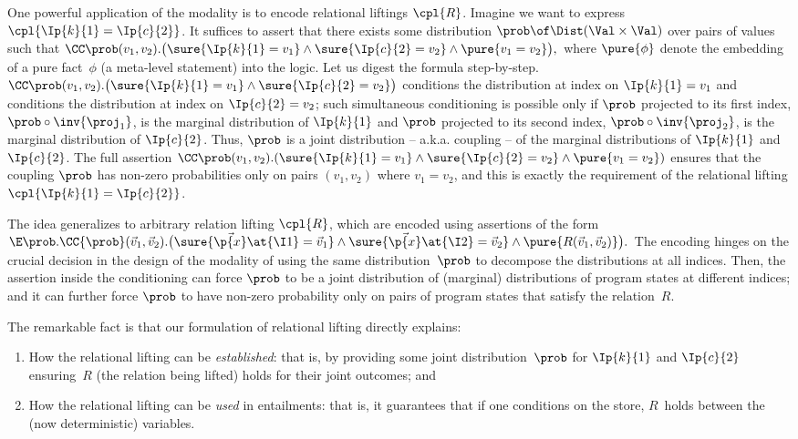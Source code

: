 \documentclass[acmsmall,nonacm,screen,appendix]{acmart}
\begin{document}
One powerful application of the \supercond modality is to encode relational
liftings $\cpl{R}$.
Imagine we want to express $\cpl{ \Ip{k}{1} = \Ip{c}{2} }$.
It suffices to assert that there exists some distribution
$\prob \of \Dist(\Val\times\Val)$ over pairs of values such that
$
  \CC\prob (v_1,v_2).\bigl(
    \sure{\Ip{k}{1} = v_1} \land
    \sure{\Ip{c}{2} = v_2} \land
    \pure{v_1=v_2}
  \bigr),
$
where $\pure{\phi}$ denote the embedding of a pure fact~$\phi$ (\ie a meta-level statement) into the logic. Let us digest the formula step-by-step.
$\CC\prob (v_1,v_2). \bigl(\sure{\Ip{k}{1} = v_1} \land \sure{\Ip{c}{2} = v_2}\bigr)$
conditions the distribution at index  on $\Ip{k}{1} = v_1$ and
conditions the distribution at index  on $\Ip{c}{2} = v_2$;
such simultaneous conditioning is possible only if $\prob$ projected
to its first index, $\prob \circ \inv{\proj_1}$, is the marginal distribution
of $\Ip{k}{1}$ and $\prob$ projected to its second index, $\prob \circ
\inv{\proj_2}$, is the marginal distribution of $\Ip{c}{2}$.
Thus, $\prob$ is a joint distribution -- a.k.a. coupling -- of the marginal distributions of $\Ip{k}{1}$ and $\Ip{c}{2}$.
The full assertion $\CC\prob (v_1,v_2).(
    \sure{\Ip{k}{1} = v_1} \land
    \sure{\Ip{c}{2} = v_2} \land
    \pure{v_1=v_2})$
ensures that the coupling $\prob$ has non-zero probabilities only on pairs
$(v_1, v_2)$ where $v_1 = v_2$, and this is exactly the requirement of the relational lifting $\cpl{\Ip{k}{1} = \Ip{c}{2}}$.


The idea generalizes to arbitrary relation lifting $\cpl{R}$,
which are encoded using assertions of the form
$
  \E\prob.\CC{\prob} (\vec{v}_1,\vec{v}_2).\bigl(
    \sure{\vec{\p{x}}\at{\I1}=\vec{v}_1}
    \land
    \sure{\vec{\p{x}}\at{\I2}=\vec{v}_2}
    \land
    \pure{R(\vec{v}_1,\vec{v}_2)}
  \bigr).
$
The encoding hinges on the crucial decision in the design of the
\supercond modality of using the same distribution~$\prob$ to
decompose the distributions at all indices.
Then, the assertion inside the conditioning can force $\prob$ to be
a joint distribution of (marginal) distributions of program states at
different indices; and it can further force $\prob$ to have non-zero
probability only on pairs of program states that satisfy the relation~$R$.


\begin{result}
The remarkable fact is that our formulation of
relational lifting directly explains:
\begin{enumerate}
\item How the relational lifting can be \emph{established}:
  that is, by providing some joint distribution~$\prob$ for
  $\Ip{k}{1}$ and $\Ip{c}{2}$ ensuring~$R$ (the relation being lifted)
  holds for their joint outcomes;
  and
\item
  How the relational lifting can be \emph{used} in entailments:
  that is, it guarantees that if one conditions on the store,
  $R$~holds between the (now deterministic) variables.
\end{enumerate}
\end{result}
\end{document}
